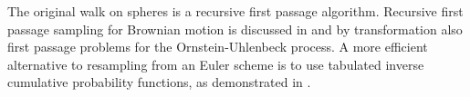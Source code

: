 \documentclass[a4paper,12pt]{article}
\begin{document}


\begin{related}
  The original walk on spheres is a recursive first passage algorithm.
  Recursive first passage sampling for
  Brownian motion is discussed in \cite{herrmann_first-passage_2016}
  and by transformation also first passage problems for the
  Ornstein-Uhlenbeck process.
  A more efficient alternative to resampling from an Euler scheme is to use tabulated
  inverse cumulative probability functions,
  as demonstrated in \cite{hwang_simulationtabulation_2001}.
\end{related}




\end{document}
